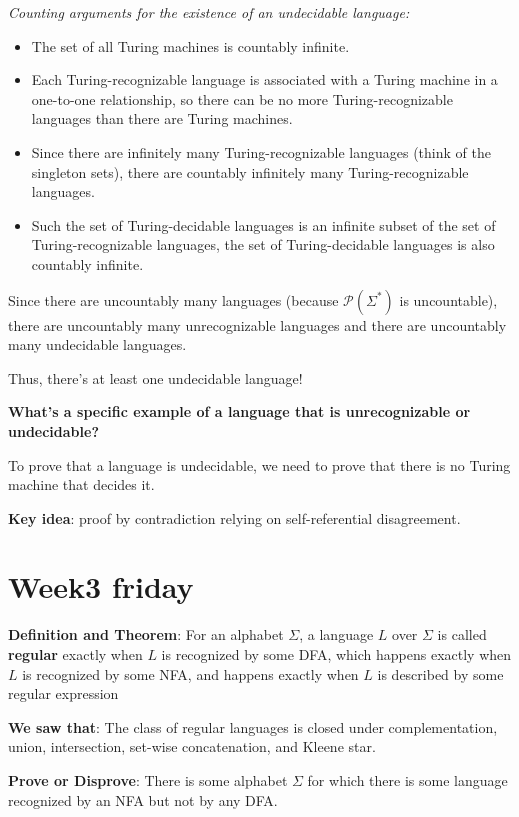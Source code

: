 \documentclass[12pt, oneside]{article}
\begin{document}
{\it Counting arguments for the existence of an undecidable language:}
\begin{itemize}
    \item The set of all Turing machines is countably infinite.
    \item Each Turing-recognizable language is associated with a Turing machine
    in a one-to-one relationship, so there can be no more Turing-recognizable
    languages than there are Turing machines. 
    \item Since there are infinitely many Turing-recognizable languages
    (think of the singleton sets), there are countably infinitely 
    many Turing-recognizable languages.
    \item Such the set of Turing-decidable languages is an infinite subset 
    of the set of Turing-recognizable languages, the set of 
    Turing-decidable languages is also countably infinite.
\end{itemize}

Since there are uncountably many languages (because $\mathcal{P}(\Sigma^*)$
is uncountable), there are uncountably many unrecognizable languages
and there are uncountably many undecidable languages.


Thus, there's at least one undecidable language!

\vfill

{\bf What's a specific example of a language that is unrecognizable or undecidable?}

To prove that a language is undecidable, we need to prove that there is no Turing machine that decides it.

{\bf Key idea}: proof by contradiction relying on self-referential disagreement.

 \vfill
\section*{Week3 friday}


{\bf Definition and Theorem}: For an alphabet $\Sigma$, a language $L$ over $\Sigma$ is called {\bf regular}
exactly when $L$ is recognized by some DFA, which happens exactly when $L$ is recognized by some NFA, 
and happens exactly when $L$ is described by some regular expression

{\bf We saw that}: The class of regular languages is closed under complementation, union, 
intersection, set-wise concatenation, and Kleene star.

{\bf Prove or Disprove}: There is some alphabet $\Sigma$ for which there is 
some language recognized by an NFA but not by any DFA.
\end{document}
